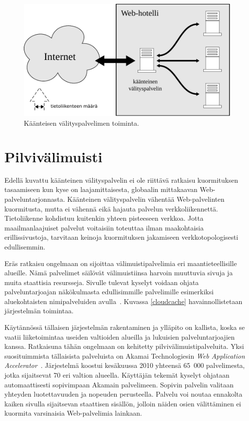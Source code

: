 \begin{figure}[htp]
\centering
\includegraphics[width=12cm]{pics/reverseproxy.pdf}
\caption{Käänteisen välityspalvelimen toiminta.}
\label{reverseproxy}
\end{figure}

\newpage

\section{Pilvivälimuisti}

Edellä kuvattu käänteinen välityspalvelin ei ole riittävä ratkaisu
kuormituksen tasaamiseen kun kyse on laajamittaisesta, globaalin
mittakaavan Web-\-palveluntarjonnasta. Käänteinen välityspalvelin
vähentää Web-palvelinten kuormitusta, mutta ei vähennä eikä hajauta
palvelun verkkoliikennettä. Tietoliikenne kohdistuu kuitenkin yhteen
pisteeseen verkkoa. Jotta maailmanlaajuiset palvelut voitaisiin
toteuttaa ilman maakohtaisia erillissivustoja, tarvitaan keinoja
kuormituksen jakamiseen verkkotopologisesti edullisemmin.

Eräs ratkaisu ongelmaan on sijoittaa välimuistipalvelimia eri
maantieteellisille alueille. Nämä palvelimet säilövät välimuistiinsa
harvoin muuttuvia sivuja ja muita staattisia resursseja. Sivulle
tulevat kyselyt voidaan ohjata palveluntarjoajan näkökulmasta
edullisimmille palvelimille esimerkiksi aluekohtaisten nimipalveluiden
avulla~\cite{geodns}. Kuvassa \ref{cloudcache} havainnollistetaan
järjestelmän toimintaa.

Käytännössä tällaisen järjestelmän rakentaminen ja ylläpito on
kallista, koska se vaatii liiketoimintaa useiden valtioiden alueilla ja
lukuisien palveluntarjoajien kanssa. Ratkaisuna tähän ongelmaan on kehitetty
pilvivälimuistipalveluita.
Yksi suosituimmista tällaisista palveluista on Akamai Technologiesin
\textit{Web Ap\-plic\-a\-tion Accelerator}~\cite{akamai}. Järjestelmä
koostui kesäkuussa 2010 yhteensä 65~000 palvelimesta, jotka
sijaitsevat 70 eri valtion alueella. Käyttäjän tekemät kyselyt
ohjataan automaattisesti sopivimpaan Akamain palvelimeen. Sopivin
palvelin valitaan yhteyden luotettavuuden ja nopeuden
perusteella. Palvelu voi noutaa ennakolta kaiken sivulla sijaitsevan
staattisen sisällön, jolloin näiden osien välittäminen ei kuormita
varsinaisia Web-palvelimia lainkaan.

